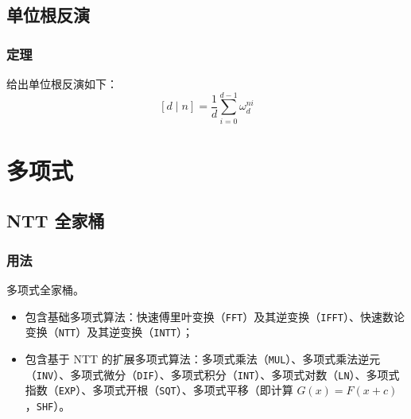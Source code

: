 \documentclass[10pt]{ctexart}
\providecommand{\tightlist}{\setlength{\itemsep}{0pt}\setlength{\parskip}{0pt}}
\newcommand{\passthrough}[1]{#1}
\begin{document}
\begin{multicols}{3}
    \subsection{单位根反演}\label{ux5355ux4f4dux6839ux53cdux6f14}

    \subsubsection{定理}\label{ux5b9aux7406-3}

    给出单位根反演如下：\[
    [d\mid n] = \frac{1}{d}\sum_{i=0}^{d-1}\omega_{d}^{ni}
    \]

    \section{多项式}\label{ux591aux9879ux5f0f}

    \subsection{NTT 全家桶}\label{ntt-ux5168ux5bb6ux6876}

    \subsubsection{用法}\label{ux7528ux6cd5-13}

    多项式全家桶。

    \begin{itemize}
    \tightlist
    \item
      包含基础多项式算法：快速傅里叶变换（\passthrough{\lstinline!FFT!}）及其逆变换（\passthrough{\lstinline!IFFT!}）、快速数论变换（\passthrough{\lstinline!NTT!}）及其逆变换（\passthrough{\lstinline!INTT!}）；
    \item
      包含基于 NTT
      的扩展多项式算法：多项式乘法（\passthrough{\lstinline!MUL!}）、多项式乘法逆元（\passthrough{\lstinline!INV!}）、多项式微分（\passthrough{\lstinline!DIF!}）、多项式积分（\passthrough{\lstinline!INT!}）、多项式对数（\passthrough{\lstinline!LN!}）、多项式指数（\passthrough{\lstinline!EXP!}）、多项式开根（\passthrough{\lstinline!SQT!}）、多项式平移（即计算
      \(G(x) = F(x + c)\)，\passthrough{\lstinline!SHF!}）。
    \end{itemize}


\end{multicols}
\end{document}
